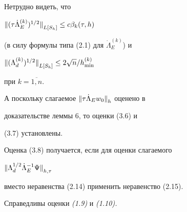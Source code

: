 \begin{pf}
Нетрудно видеть, что 


${\|(\tau\Dot\Lambda_E^{(k)})^{1/2}\|}_{L[S_h]}\le c\beta_k(\tau,h)$


(в силу формулы типа (2.1) для $\Dot\Lambda^{(k)}_E$) и


${\|(\Lambda_d^{(k)})^{1/2}\|}_{L[S_h]}\le 2 \sqrt n/h_{\min}^{(k)}$ 


при $k=\overline{1,n}$.


А поскольку слагаемое ${\| \tau\Dot\Lambda_Ew_0\|}_h$ оценено в 


доказательстве леммы 6, то оценки (3.6) и


(3.7) установлены.





Оценка (3.8) получается, если для оценки слагаемого


${\|\Lambda_d^{1/2}\Dot\Lambda_E^{-1}\Psi\|}_{h,\tau}$


вместо неравенства (2.14) применить неравенство (2.15).


\end{pf}





\begin{lem}


Справедливы оценки {\em (1.9)} и {\em (1.10).}


\end{lem}





